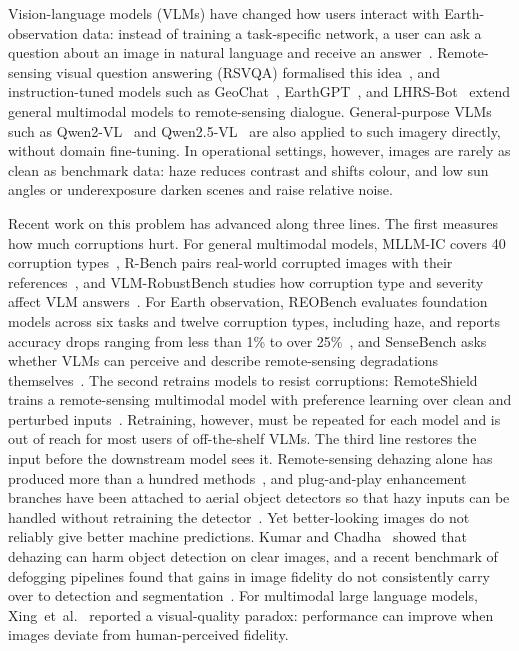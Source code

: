 \documentclass[lettersize,journal]{IEEEtran}
\begin{document}
Vision-language models (VLMs) have changed how users interact with Earth-observation data: instead of training a task-specific network, a user can ask a question about an image in natural language and receive an answer~\cite{li2024vlmrs, weng2025vlmrs}. Remote-sensing visual question answering (RSVQA) formalised this idea~\cite{lobry2020rsvqa}, and instruction-tuned models such as GeoChat~\cite{kuckreja2024geochat}, EarthGPT~\cite{zhang2024earthgpt}, and LHRS-Bot~\cite{muhtar2024lhrsbot} extend general multimodal models to remote-sensing dialogue. General-purpose VLMs such as Qwen2-VL~\cite{wang2024qwen2vl} and Qwen2.5-VL~\cite{bai2025qwen25vl} are also applied to such imagery directly, without domain fine-tuning. In operational settings, however, images are rarely as clean as benchmark data: haze reduces contrast and shifts colour, and low sun angles or underexposure darken scenes and raise relative noise.

Recent work on this problem has advanced along three lines. The first measures how much corruptions hurt. For general multimodal models, MLLM-IC covers 40 corruption types~\cite{qiu2025mllmic}, R-Bench pairs real-world corrupted images with their references~\cite{li2024rbench}, and VLM-RobustBench studies how corruption type and severity affect VLM answers~\cite{saxena2026vlmrobustbench}. For Earth observation, REOBench evaluates foundation models across six tasks and twelve corruption types, including haze, and reports accuracy drops ranging from less than 1\% to over 25\%~\cite{li2025reobench}, and SenseBench asks whether VLMs can perceive and describe remote-sensing degradations themselves~\cite{zhong2026sensebench}. The second retrains models to resist corruptions: RemoteShield trains a remote-sensing multimodal model with preference learning over clean and perturbed inputs~\cite{min2026remoteshield}. Retraining, however, must be repeated for each model and is out of reach for most users of off-the-shelf VLMs. The third line restores the input before the downstream model sees it. Remote-sensing dehazing alone has produced more than a hundred methods~\cite{zhou2026rsdehazing}, and plug-and-play enhancement branches have been attached to aerial object detectors so that hazy inputs can be handled without retraining the detector~\cite{wu2024plugplay}. Yet better-looking images do not reliably give better machine predictions. Kumar and Chadha~\cite{kumar2025fogfailure} showed that dehazing can harm object detection on clear images, and a recent benchmark of defogging pipelines found that gains in image fidelity do not consistently carry over to detection and segmentation~\cite{aryashad2025filters}. For multimodal large language models, Xing~et~al.~\cite{xing2025vqparadox} reported a visual-quality paradox: performance can improve when images deviate from human-perceived fidelity.
\end{document}
